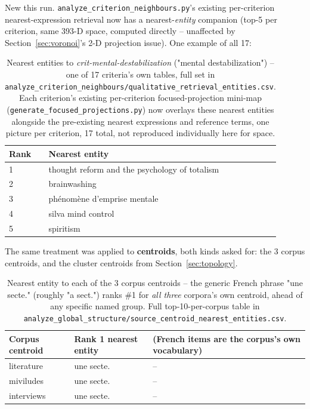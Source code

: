 \documentclass[11pt,a4paper]{article}
\begin{document}
New this run. \texttt{analyze\_criterion\_neighbours.py}'s existing
per-criterion nearest-expression retrieval now has a nearest-\emph{entity}
companion (top-5 per criterion, same 393-D space, computed directly --
unaffected by Section~\ref{sec:voronoi}'s 2-D projection issue). One
example of all 17:

\begin{table}[h!]
\centering
\small
\begin{tabular}{ll}
\toprule
Rank & Nearest entity \\
\midrule
1 & thought reform and the psychology of totalism \\
2 & brainwashing \\
3 & phénomène d'emprise mentale \\
4 & silva mind control \\
5 & spiritism \\
\bottomrule
\end{tabular}
\caption{Nearest entities to \emph{crit-mental-destabilization} ("mental
destabilization") -- one of 17 criteria's own tables, full set in
\texttt{analyze\_criterion\_neighbours/qualitative\_retrieval\_entities.csv}.
Each criterion's existing per-criterion focused-projection mini-map
(\texttt{generate\_focused\_projections.py}) now overlays these nearest
entities alongside the pre-existing nearest expressions and reference
terms, one picture per criterion, 17 total, not reproduced individually
here for space.}
\end{table}

The same treatment was applied to \textbf{centroids}, both kinds asked
for: the 3 corpus centroids, and the cluster centroids from
Section~\ref{sec:topology}.

\begin{table}[h!]
\centering
\small
\begin{tabular}{lll}
\toprule
Corpus centroid & Rank 1 nearest entity & (French items are the corpus's own vocabulary) \\
\midrule
literature & une secte. & -- \\
miviludes & une secte. & -- \\
interviews & une secte. & -- \\
\bottomrule
\end{tabular}
\caption{Nearest entity to each of the 3 corpus centroids -- the generic
French phrase "une secte." (roughly "a sect.") ranks \#1 for
\emph{all three} corpora's own centroid, ahead of any specific named
group. Full top-10-per-corpus table in
\texttt{analyze\_global\_structure/source\_centroid\_nearest\_entities.csv}.}
\end{table}
\end{document}
